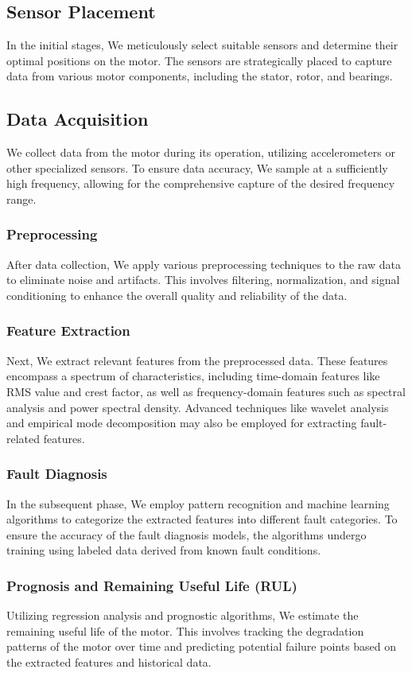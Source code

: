 \subsection{Sensor Placement}In the initial stages, We meticulously select suitable sensors and determine their optimal positions on the motor. The sensors are strategically placed to capture data from various motor components, including the stator, rotor, and bearings.
\subsection{Data Acquisition} We collect data from the motor during its operation, utilizing accelerometers or other specialized sensors. To ensure data accuracy, We sample at a sufficiently high frequency, allowing for the comprehensive capture of the desired frequency range.


\subsubsection{Preprocessing} After data collection, We apply various preprocessing techniques to the raw data to eliminate noise and artifacts. This involves filtering, normalization, and signal conditioning to enhance the overall quality and reliability of the data.
\subsubsection{Feature Extraction} Next, We extract relevant features from the preprocessed data. These features encompass a spectrum of characteristics, including time-domain features like RMS value and crest factor, as well as frequency-domain features such as spectral analysis and power spectral density. Advanced techniques like wavelet analysis and empirical mode decomposition may also be employed for extracting fault-related features.
\subsubsection{Fault Diagnosis}In the subsequent phase, We employ pattern recognition and machine learning algorithms to categorize the extracted features into different fault categories. To ensure the accuracy of the fault diagnosis models, the algorithms undergo training using labeled data derived from known fault conditions.


\subsubsection{Prognosis and Remaining Useful Life (RUL)} Utilizing regression analysis and prognostic algorithms, We estimate the remaining useful life of the motor. This involves tracking the degradation patterns of the motor over time and predicting potential failure points based on the extracted features and historical data.


